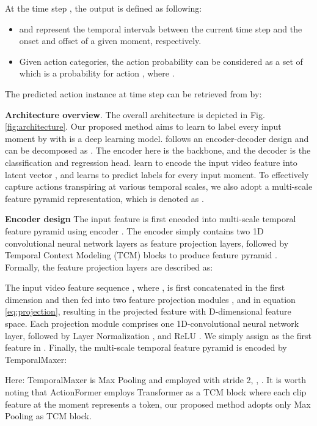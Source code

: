 \documentclass[10pt,twocolumn,letterpaper]{article}
\begin{document}
At the time step , the output  is defined as following:
\begin{itemize}
\item  and  represent the temporal intervals between the current time step  and the onset and offset of a given moment, respectively.
\item Given  action categories, the action probability  can be considered as a set of  which is a probability for action , where .
\end{itemize}
The predicted action instance at time step  can be retrieved from  by:


\textbf{Architecture overview}. The overall architecture is depicted in Fig. \ref{fig:architecture}. Our proposed method aims to learn to label every input moment by  with  is a deep learning model.  follows an encoder-decoder design and can be decomposed as . The encoder here is the backbone, and the decoder is the classification and regression head.  learn to encode the input video feature  into latent vector , and  learns to predict labels for every input moment. To effectively capture actions transpiring at various temporal scales, we also adopt a multi-scale feature pyramid representation, which is denoted as .



\textbf{Encoder design}
The input feature  is first encoded into multi-scale temporal feature pyramid  using encoder . The encoder  simply contains two 1D convolutional neural network layers as feature projection layers, followed by  Temporal Context Modeling (TCM) blocks to produce feature pyramid . Formally, the feature projection layers are described as:



The input video feature sequence , where ,  is first concatenated in the first dimension and then fed into two feature projection modules , and  in equation \ref{eq:projection}, resulting in the projected feature  with D-dimensional feature space. Each projection module comprises one 1D-convolutional neural network layer, followed by Layer Normalization \cite{ba2016layer}, and ReLU \cite{agarap2018deep}. We simply assign  as the first feature in . Finally, the multi-scale temporal feature pyramid  is encoded by TemporalMaxer:

Here: TemporalMaxer is Max Pooling and employed with stride 2, , . It is worth noting that ActionFormer \cite{zhang2022actionformer} employs Transformer \cite{vaswani2017attention} as a TCM block where each clip feature at the moment  represents a token, our proposed method adopts only Max Pooling \cite{boureau2010theoretical} as TCM block.
\end{document}
